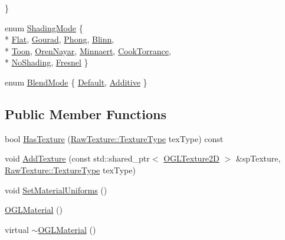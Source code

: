 \begin{DoxyCompactItemize}
 \}
\item 
enum \hyperlink{class_o_g_l_material_a00ec5436848c78403b6663c2a02f088f}{Shading\+Mode} \{ \\*
\hyperlink{class_o_g_l_material_a00ec5436848c78403b6663c2a02f088fa42b56337fd1dc43656d50d2fde662a23}{Flat}, 
\hyperlink{class_o_g_l_material_a00ec5436848c78403b6663c2a02f088fa0325ae38b5ee6bd8ae52bac388349bee}{Gourad}, 
\hyperlink{class_o_g_l_material_a00ec5436848c78403b6663c2a02f088fac225445a53951d9137587f735657f543}{Phong}, 
\hyperlink{class_o_g_l_material_a00ec5436848c78403b6663c2a02f088fae5a55ff69e3fc8bdb83f921cdd3a9a3c}{Blinn}, 
\\*
\hyperlink{class_o_g_l_material_a00ec5436848c78403b6663c2a02f088fa3f5f6ecc390dbfbec5b68643661fe076}{Toon}, 
\hyperlink{class_o_g_l_material_a00ec5436848c78403b6663c2a02f088faa2ca11b89f8a245872e4b05ae4031d13}{Oren\+Nayar}, 
\hyperlink{class_o_g_l_material_a00ec5436848c78403b6663c2a02f088fac432798ece11cf67f7bd7db9fdfbf730}{Minnaert}, 
\hyperlink{class_o_g_l_material_a00ec5436848c78403b6663c2a02f088fad9a50343accc4627efef4f59d7cf6444}{Cook\+Torrance}, 
\\*
\hyperlink{class_o_g_l_material_a00ec5436848c78403b6663c2a02f088faa350570138ca7bb576e6badcdc23616e}{No\+Shading}, 
\hyperlink{class_o_g_l_material_a00ec5436848c78403b6663c2a02f088fa210b041c2fcfecb49a4fdd1095296eac}{Fresnel}
 \}
\item 
enum \hyperlink{class_o_g_l_material_acd49212071e5ca8ff7093a7536186271}{Blend\+Mode} \{ \hyperlink{class_o_g_l_material_acd49212071e5ca8ff7093a7536186271ad8fb02dd08e3a1b9030886bec1aef727}{Default}, 
\hyperlink{class_o_g_l_material_acd49212071e5ca8ff7093a7536186271a003e5426d86969aefced5427cd2dd540}{Additive}
 \}
\end{DoxyCompactItemize}
\subsection*{Public Member Functions}
\begin{DoxyCompactItemize}
\item 
bool \hyperlink{class_o_g_l_material_a877ee9c7b6125f4a11508a3ea47581b0}{Has\+Texture} (\hyperlink{class_raw_texture_ac0eafe7206f7f38aeb4e8e5631480f6d}{Raw\+Texture\+::\+Texture\+Type} tex\+Type) const 
\item 
void \hyperlink{class_o_g_l_material_a4d4de708b2dc2db1693e7d451d0d4941}{Add\+Texture} (const std\+::shared\+\_\+ptr$<$ \hyperlink{class_o_g_l_texture2_d}{O\+G\+L\+Texture2\+D} $>$ \&sp\+Texture, \hyperlink{class_raw_texture_ac0eafe7206f7f38aeb4e8e5631480f6d}{Raw\+Texture\+::\+Texture\+Type} tex\+Type)
\item 
void \hyperlink{class_o_g_l_material_a0b125e4861e997f7502944fe46382afd}{Set\+Material\+Uniforms} ()
\item 
\hyperlink{class_o_g_l_material_a57900a77e7dd93a1285816d4aa437248}{O\+G\+L\+Material} ()
\item 
virtual \hyperlink{class_o_g_l_material_ac27d566580885dedcb6b4c3dca50693b}{$\sim$\+O\+G\+L\+Material} ()
\end{DoxyCompactItemize}

